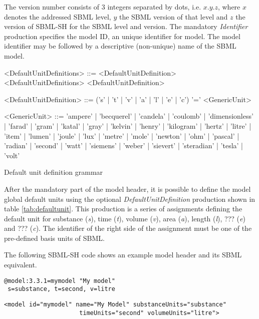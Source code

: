 \documentclass[a4paper]{article}
\begin{document}
The version number consists of 3 integers separated by dots, i.e. $x.y.z$, where $x$ denotes the addressed SBML level, $y$ the SBML version of that level and $z$ the version of SBML-SH for the SBML level and version. The mandatory \emph{Identifier} production specifies the model ID, an unique identifier for model. The model identifier may be followed by a descriptive (non-unique) name of the SBML model. 

\begin{table}[h!]
\begin{grammar}
<DefaultUnitDefinitions> ::= <DefaultUnitDefinition> <DefaultUnitDefinitions>
  \alt <DefaultUnitDefinition>

<DefaultUnitDefinition> ::= ('s' | 't' | 'v' | 'a' | 'l' | 'e' | 'c') '=' <GenericUnit>

<GenericUnit> ::= 'ampere' | 'becquerel' | 'candela' | 'coulomb' | 'dimensionless' | 'farad' | 'gram' | 'katal' | 'gray' | 'kelvin' | 'henry' | 'kilogram' | 'hertz' | 'litre' | 'item' | 'lumen' | 'joule' | 'lux' | 'metre' | 'mole' | 'newton' | 'ohm' | 'pascal' | 'radian' | 'second' | 'watt' | 'siemens' | 'weber' | 'sievert' | 'steradian' | 'tesla' | 'volt'
\end{grammar}
\caption{Default unit definition grammar} \label{tab:defaultunit}
\end{table}

After the mandatory part of the model header, it is possible to define the model global default units using the optional \emph{DefaultUnitDefinition} production shown in table \ref{tab:defaultunit}. This production is a series of assignments defining the default unit for substance (\emph{s}), time (\emph{t}), volume (\emph{v}), area (\emph{a}), length (\emph{l}), ??? (\emph{e}) and ??? (\emph{c}). The identifier of the right side of the assignment must be one of the pre-defined basis units of SBML.

The following SBML-SH code shows an example model header and its SBML equivalent.

\begin{lstlisting}
@model:3.3.1=mymodel "My model"
 s=substance, t=second, v=litre
\end{lstlisting}

\lstset{language=XML}
\begin{lstlisting}
<model id="mymodel" name="My Model" substanceUnits="substance"
                     timeUnits="second" volumeUnits="litre">
\end{lstlisting}
\end{document}
